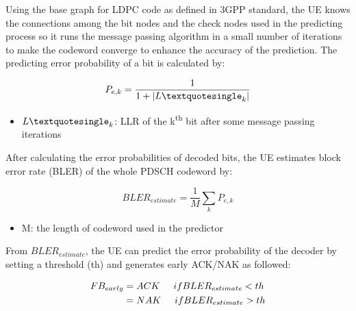 \documentclass[conference]{IEEEtran}
\begin{document}
Using the base graph for LDPC code as defined in 3GPP standard, the UE knows the connections among the bit nodes and the check nodes used in the predicting process so it runs the message passing algorithm in a small number of iterations to make the codeword converge to enhance the accuracy of the prediction. The predicting error probability of a bit is calculated by:

\begin{equation}
    P_{e,k} = \frac{1}{1 + |L\textquotesingle_{k}|}
\end{equation}

\begin{itemize}
    \item $L\textquotesingle_{k}$: LLR of the k\textsuperscript{th} bit after some message passing iterations
\end{itemize}

After calculating the error probabilities of decoded bits, the UE estimates block error rate (BLER) of the whole PDSCH codeword by:

\begin{equation}
    BLER_{estimate} = \frac{1}{M} \sum_{k} P_{e,k}
\end{equation}

\begin{itemize}
    \item M: the length of codeword used in the predictor
\end{itemize}

From $BLER_{estimate}$, the UE can predict the error probability of the decoder by setting a threshold (th) and generates early ACK/NAK as followed:

\begin{equation}
\begin{split}  
    FB_{early} & = ACK \hspace{0.5cm} if BLER_{estimate} < th\\
               & = NAK  \hspace{0.5cm} if BLER_{estimate} > th \label{eq9}
\end{split}
\end{equation}
\end{document}
